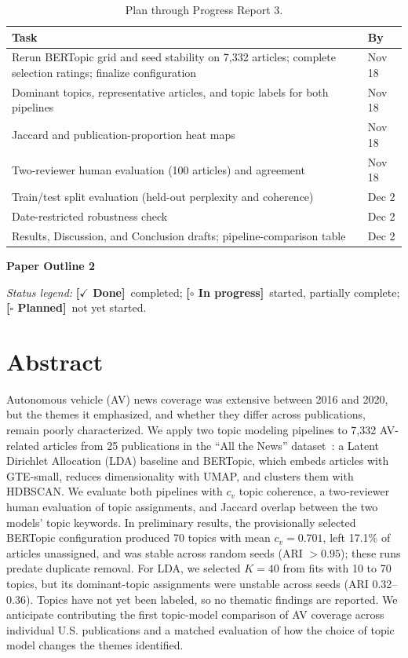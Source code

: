 \documentclass[conference]{IEEEtran}
\newcommand{\done}{\textcolor{green!40!black}{\textbf{[$\checkmark$ Done]}}}
\newcommand{\wip}{\textcolor{orange!70!black}{\textbf{[$\circ$ In progress]}}}
\newcommand{\planned}{\textcolor{blue!60!black}{\textbf{[$\square$ Planned]}}}
\begin{document}
\begin{table}[H]
\caption{Plan through Progress Report 3.}
\label{tab:plan}
\centering
\footnotesize
\setlength{\tabcolsep}{3pt}
\begin{tabular}{@{}p{}l@{}}
\toprule
\textbf{Task} & \textbf{By} \\
\midrule
Rerun BERTopic grid and seed stability on 7,332 articles; complete selection ratings; finalize configuration & Nov 18 \\
Dominant topics, representative articles, and topic labels for both pipelines & Nov 18 \\
Jaccard and publication-proportion heat maps & Nov 18 \\
Two-reviewer human evaluation (100 articles) and agreement & Nov 18 \\
Train/test split evaluation (held-out perplexity and coherence) & Dec 2 \\
Date-restricted robustness check & Dec 2 \\
Results, Discussion, and Conclusion drafts; pipeline-comparison table & Dec 2 \\
\bottomrule
\end{tabular}
\end{table}

\begin{center}\large\textbf{Paper Outline 2}\end{center}
\noindent\emph{Status legend:} \done~completed;
\wip~started, partially complete; \planned~not yet started.

\section*{Abstract}
Autonomous vehicle (AV) news coverage was extensive between 2016 and 2020, but the themes it emphasized, and whether they differ across publications, remain poorly characterized. We apply two topic modeling pipelines to 7,332 AV-related articles from 25 publications in the ``All the News'' dataset~\cite{mckinley2021}: a Latent Dirichlet Allocation (LDA) baseline and BERTopic, which embeds articles with GTE-small, reduces dimensionality with UMAP, and clusters them with HDBSCAN. We evaluate both pipelines with $c_v$ topic coherence, a two-reviewer human evaluation of topic assignments, and Jaccard overlap between the two models' topic keywords. In preliminary results, the provisionally selected BERTopic configuration produced 70 topics with mean $c_v=0.701$, left 17.1\% of articles unassigned, and was stable across random seeds (ARI $>0.95$); these runs predate duplicate removal. For LDA, we selected $K=40$ from fits with 10 to 70 topics, but its dominant-topic assignments were unstable across seeds (ARI 0.32--0.36). Topics have not yet been labeled, so no thematic findings are reported. We anticipate contributing the first topic-model comparison of AV coverage across individual U.S. publications and a matched evaluation of how the choice of topic model changes the themes identified.
\end{document}
